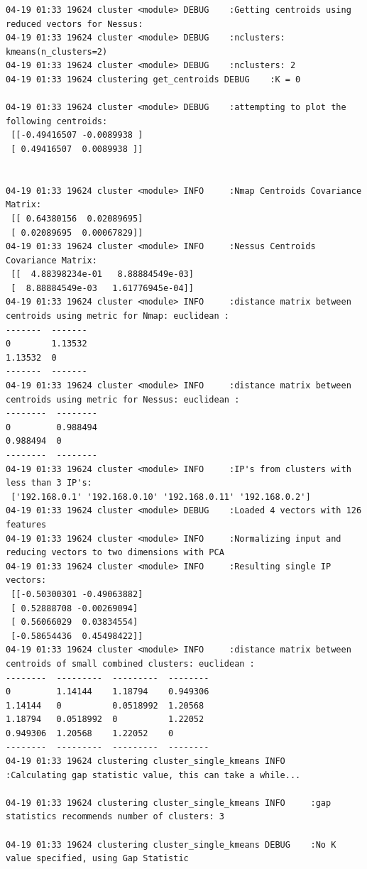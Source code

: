 \begin{lstlisting}[style=lineoutput]
04-19 01:33 19624 cluster <module> DEBUG    :Getting centroids using reduced vectors for Nessus:
04-19 01:33 19624 cluster <module> DEBUG    :nclusters: kmeans(n_clusters=2)
04-19 01:33 19624 cluster <module> DEBUG    :nclusters: 2
04-19 01:33 19624 clustering get_centroids DEBUG    :K = 0

04-19 01:33 19624 cluster <module> DEBUG    :attempting to plot the following centroids:
 [[-0.49416507 -0.0089938 ]
 [ 0.49416507  0.0089938 ]]


04-19 01:33 19624 cluster <module> INFO     :Nmap Centroids Covariance Matrix:
 [[ 0.64380156  0.02089695]
 [ 0.02089695  0.00067829]]
04-19 01:33 19624 cluster <module> INFO     :Nessus Centroids Covariance Matrix:
 [[  4.88398234e-01   8.88884549e-03]
 [  8.88884549e-03   1.61776945e-04]]
04-19 01:33 19624 cluster <module> INFO     :distance matrix between centroids using metric for Nmap: euclidean :
-------  -------
0        1.13532
1.13532  0
-------  -------
04-19 01:33 19624 cluster <module> INFO     :distance matrix between centroids using metric for Nessus: euclidean :
--------  --------
0         0.988494
0.988494  0
--------  --------
04-19 01:33 19624 cluster <module> INFO     :IP's from clusters with less than 3 IP's:
 ['192.168.0.1' '192.168.0.10' '192.168.0.11' '192.168.0.2']
04-19 01:33 19624 cluster <module> DEBUG    :Loaded 4 vectors with 126 features
04-19 01:33 19624 cluster <module> INFO     :Normalizing input and reducing vectors to two dimensions with PCA
04-19 01:33 19624 cluster <module> INFO     :Resulting single IP vectors:
 [[-0.50300301 -0.49063882]
 [ 0.52888708 -0.00269094]
 [ 0.56066029  0.03834554]
 [-0.58654436  0.45498422]]
04-19 01:33 19624 cluster <module> INFO     :distance matrix between centroids of small combined clusters: euclidean :
--------  ---------  ---------  --------
0         1.14144    1.18794    0.949306
1.14144   0          0.0518992  1.20568
1.18794   0.0518992  0          1.22052
0.949306  1.20568    1.22052    0
--------  ---------  ---------  --------
04-19 01:33 19624 clustering cluster_single_kmeans INFO     :Calculating gap statistic value, this can take a while...

04-19 01:33 19624 clustering cluster_single_kmeans INFO     :gap statistics recommends number of clusters: 3

04-19 01:33 19624 clustering cluster_single_kmeans DEBUG    :No K value specified, using Gap Statistic


\end{lstlisting}
